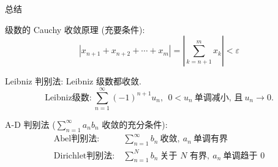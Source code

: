 \begin{frame}{总结}

{\larger[2] \color{red} } 级数的 Cauchy 收敛原理 (充要条件):
\[\left\lvert x_{n+1} + x_{n+2} + \cdots + x_m \right\rvert = \left\lvert \sum\limits_{k=n+1}^m x_k \right\rvert < \varepsilon\]

\pause

{\larger[2] \color{red} } Leibniz 判别法: Leibniz 级数都收敛.
\[\text{Leibniz级数:}~\sum\limits_{n=1}^{\infty} (-1)^{n+1} u_n, ~~ 0 < u_n ~ \text{单调减小, 且} ~ u_n \to 0.\]

\pause

{\larger[2] \color{red} } A-D 判别法 ($\sum\limits_{n=1}^{\infty} a_n b_n$ 收敛的充分条件):
\begin{align*}
\text{Abel判别法:} ~ & \sum\limits_{n=1}^{\infty} b_n ~ \text{收敛}, ~ a_n ~ \text{单调有界} \\
\text{Dirichlet判别法:} ~ & \sum\limits_{n=1}^{N} b_n ~ \text{关于 $N$ 有界}, ~ a_n ~ \text{单调趋于 $0$}
\end{align*}

\end{frame}









